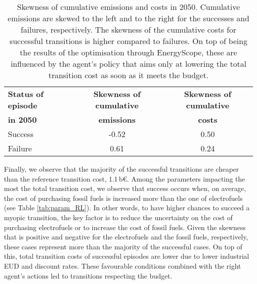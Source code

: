 \documentclass[11pt,twoside,a4paper,english]{article}
\begin{document}
\begin{table}[htbp!]
\caption{Skewness of cumulative emissions and costs in 2050. Cumulative emissions are skewed to the left and to the right for the successes and failures, respectively. The skewness of the cumulative costs for successful transitions is higher compared to failures. On top of being the results of the optimisation through EnergyScope, these are influenced by the agent's policy that aims only at lowering the total transition cost as soon as it meets the  budget.}
\label{tab:skewness_gwp_cost}
\centering
\begin{tabular}{l c c}
\toprule
\textbf{Status of episode}  & \textbf{Skewness of cumulative} & \textbf{Skewness of cumulative} \\
\textbf{in 2050}  & \textbf{emissions} & \textbf{costs} \\	
\midrule
Success & -0.52 & 0.50 \\
Failure & 0.61 & 0.24 \\
\bottomrule							

\end{tabular}
\end{table}

Finally, we observe that the majority of the successful transitions are cheaper than the reference transition cost, 1.1\,b€. Among the parameters impacting the most the total transition cost, we observe that success occurs when, on average,  the cost of purchasing fossil fuels is increased more than the one of electrofuels (see Table \ref{tab:param_RL}). In other words, to have higher chances to succeed a myopic transition, the key factor is to reduce the uncertainty on the cost of purchasing electrofuels or to increase the cost of fossil fuels. Given the skewness that is positive and negative for the electrofuels and the fossil fuels, respectively, these cases represent more than the majority of the successful cases. On top of this, total transition costs of successful episodes are lower due to lower industrial \gls{EUD} and discount rates. These favourable conditions combined with the right agent's actions led to transitions respecting the  budget.
\end{document}
